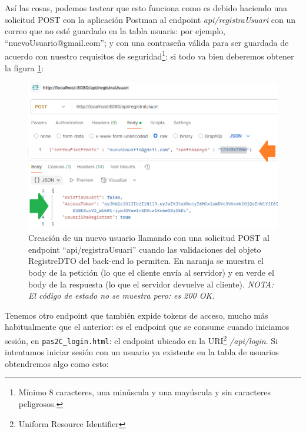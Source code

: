 \documentclass[a4paper,12pt]{report}
\begin{document}
		
		Así las cosas, podemos testear que esto funciona como es debido haciendo una solicitud POST con la aplicación Postman\cite{postman_api_platform} al endpoint \textit{api/registraUsuari} con un correo que no esté guardado en la tabla usuaris: por ejemplo, ``nuevoUsuario@gmail.com''; y con una contraseña válida para ser guardada de acuerdo con nuestro requisitos de seguridad\footnote{Mínimo 8 caracteres, una minúscula y una mayúscula y sin caracteres peligrosos.}: si todo va bien deberemos obtener la figura \ref{fig:detallPostmanRegistraUsuari}:
		
		
		
		\setlength{\abovecaptionskip}{0pt}
		\FloatBarrier
		\begin{figure}[H]
			\centering
			\includegraphics[width=1\textwidth]{img/detallPostmanRegistraUsuari.png}
			\caption{Creación de un nuevo usuario llamando con una solicitud POST al endpoint ``api/registraUsuari'' cuando las validaciones del objeto RegistreDTO del back-end lo permiten. En naranja se muestra el body de la petición (lo que el cliente envía al servidor) y en verde el body de la respuesta (lo que el servidor devuelve al cliente). \textit{NOTA: El código de estado no se muestra pero: es 200 OK.}}
			
			\label{fig:detallPostmanRegistraUsuari} 
		\end{figure}
		\FloatBarrier
		
		
		Tenemos otro endpoint que también expide tokens de acceso, mucho más habitualmente que el anterior: es el endpoint que se consume cuando iniciamos sesión, en \texttt{pas2C\_login.html}: el endpoint ubicado en la URI\footnote{Uniform Resource Identifier} \textit{/api/login}. Si intentamos iniciar sesión con un usuario ya existente en la tabla de usuarios obtendremos algo como esto:
		
\end{document}

